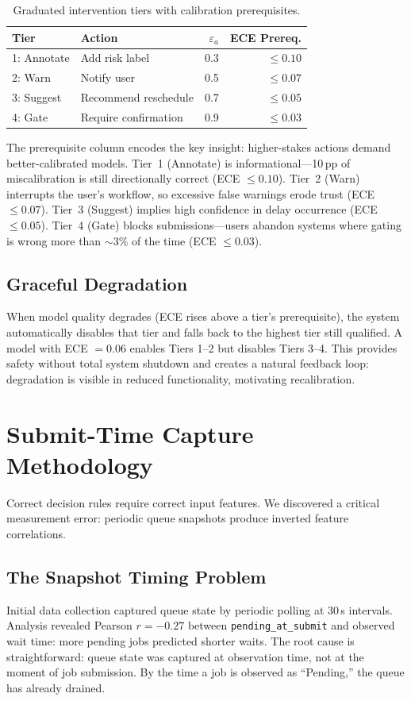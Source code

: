 \documentclass[sigconf]{acmart}
\begin{document}
\begin{table}[t]
\centering
\caption{Graduated intervention tiers with calibration prerequisites.}
\label{tab:tiers}
\small
\begin{tabular}{@{}llrr@{}}
\toprule
\textbf{Tier} & \textbf{Action} & \textbf{$\varepsilon_a$} & \textbf{ECE Prereq.} \\
\midrule
1: Annotate & Add risk label          & 0.3 & $\le 0.10$ \\
2: Warn     & Notify user             & 0.5 & $\le 0.07$ \\
3: Suggest  & Recommend reschedule    & 0.7 & $\le 0.05$ \\
4: Gate     & Require confirmation    & 0.9 & $\le 0.03$ \\
\bottomrule
\end{tabular}
\end{table}

The prerequisite column encodes the key insight: higher-stakes actions demand better-calibrated models. Tier~1 (Annotate) is informational---10\,pp of miscalibration is still directionally correct (ECE $\le 0.10$). Tier~2 (Warn) interrupts the user's workflow, so excessive false warnings erode trust (ECE $\le 0.07$). Tier~3 (Suggest) implies high confidence in delay occurrence (ECE $\le 0.05$). Tier~4 (Gate) blocks submissions---users abandon systems where gating is wrong more than $\sim 3\%$ of the time (ECE $\le 0.03$).

\subsection{Graceful Degradation}
When model quality degrades (ECE rises above a tier's prerequisite), the system automatically disables that tier and falls back to the highest tier still qualified. A model with ECE $=0.06$ enables Tiers 1--2 but disables Tiers 3--4. This provides safety without total system shutdown and creates a natural feedback loop: degradation is visible in reduced functionality, motivating recalibration.

\section{Submit-Time Capture Methodology}
\label{sec:submit-time}
Correct decision rules require correct input features. We discovered a critical measurement error: periodic queue snapshots produce inverted feature correlations.

\subsection{The Snapshot Timing Problem}
Initial data collection captured queue state by periodic polling at 30\,s intervals. Analysis revealed Pearson $r=-0.27$ between \texttt{pending\_at\_submit} and observed wait time: more pending jobs predicted shorter waits. The root cause is straightforward: queue state was captured at observation time, not at the moment of job submission. By the time a job is observed as ``Pending,'' the queue has already drained.
\end{document}
